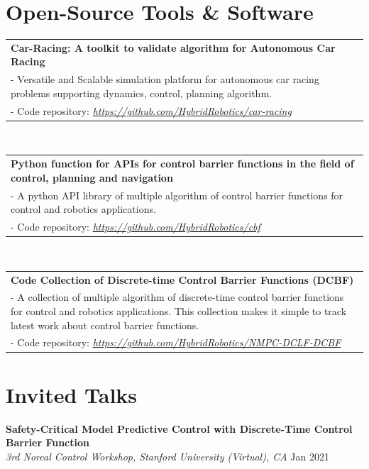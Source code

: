 \documentclass[letterpaper,10pt]{article}
\begin{document}
\section{Open-Source Tools \& Software}
\hspace*{0.5cm}
\begin{tabularx}{0.95\textwidth}{X}
\textbf{Car-Racing: A toolkit to validate algorithm for Autonomous Car Racing} \\
- Versatile and Scalable simulation platform for autonomous car racing problems supporting dynamics,
    control, planning algorithm. \\
- Code repository: 
\href{https://github.com/HybridRobotics/car-racing}{\textit{https://github.com/HybridRobotics/car-racing}}
\end{tabularx}
\\ \hfill \break

\hspace*{0.5cm}
\begin{tabularx}{0.95\textwidth}{X}
\textbf{Python function for APIs for control barrier functions in the field of control, planning and navigation} \\
- A python API library of multiple algorithm of control barrier functions for control and robotics
    applications. \\
- Code repository: \href{https://github.com/HybridRobotics/cbf}{\textit{https://github.com/HybridRobotics/cbf}}
\end{tabularx}
\\ \hfill \break

\hspace*{0.5cm}
\begin{tabularx}{0.95\textwidth}{X}
\textbf{Code Collection of Discrete-time Control Barrier Functions (DCBF)} \\
- A collection of multiple algorithm of discrete-time control barrier functions for control and
    robotics applications. This collection makes it simple to track latest work about control barrier
    functions. \\
- Code repository: \href{https://github.com/HybridRobotics/NMPC-DCLF-DCBF}{\textit{https://github.com/HybridRobotics/NMPC-DCLF-DCBF}}
\end{tabularx}

\section{Invited Talks}
\hspace*{0.5cm} \textbf{Safety-Critical Model Predictive Control with Discrete-Time Control Barrier Function} \\
\hspace*{0.5cm} \emph{3rd Norcal Control Workshop, Stanford University (Virtual), CA} \hfill Jan 2021
\end{document}

